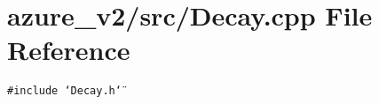 \section{azure\_\-v2/src/Decay.cpp File Reference}
\label{Decay_8cpp}
{\tt \#include \char`\"{}Decay.h\char`\"{}}\par
